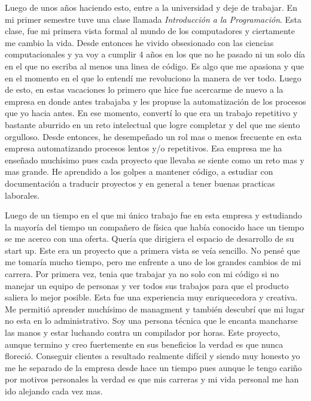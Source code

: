 \documentclass[12pt]{exam}
\begin{document}
Luego de unos años haciendo esto, entre a la universidad y deje de trabajar. En mi primer semestre tuve una clase llamada \textit{Introducción a la Programación}. Esta clase, fue mi primera vista formal al mundo de los computadores y ciertamente me cambio la vida. Desde entonces he vivido obsesionado con las ciencias computacionales y ya voy a cumplir 4 años en los que no he pasado ni un solo día en el que no escriba al menos una linea de código. Es algo que me apasiona y que en el momento en el que lo entendí me revoluciono la manera de ver todo. Luego de esto, en estas vacaciones lo primero que hice fue acercarme de nuevo a la empresa en donde antes trabajaba y les propuse la automatización de los procesos que yo hacia antes. En ese momento, convertí lo que era un trabajo repetitivo y bastante aburrido en un reto intelectual que logre completar y del que me siento orgulloso. Desde entonces, he desempeñado un rol mas o menos frecuente en esta empresa automatizando procesos lentos y/o repetitivos. Esa empresa me ha enseñado muchísimo pues cada proyecto que llevaba se siente como un reto mas y mas grande. He aprendido a los golpes a mantener código, a estudiar con documentación a traducir proyectos y en general a tener buenas practicas laborales.

Luego de un tiempo en el que mi único trabajo fue en esta empresa y estudiando la mayoría del tiempo un compañero de física que había conocido hace un tiempo se me acerco con una oferta. Quería que dirigiera el espacio de desarrollo de su start up. Este era un proyecto que a primera vista se veía sencillo. No pensé que me tomaría mucho tiempo, pero me enfrente a uno de los grandes cambios de mi carrera. Por primera vez, tenia que trabajar ya no solo con mi código si no manejar un equipo de personas y ver todos sus trabajos para que el producto saliera lo mejor posible. Esta fue una experiencia muy enriquecedora y creativa. Me permitió aprender muchísimo de managment y también descubrí que mi lugar no esta en lo administrativo. Soy una persona técnica que le encanta mancharse las manos y estar luchando contra un compilador por horas. Este proyecto, aunque termino y creo fuertemente en sus beneficios la verdad es que nunca floreció. Conseguir clientes a resultado realmente difícil y siendo muy honesto yo me he separado de la empresa desde hace un tiempo pues aunque le tengo cariño por motivos personales la verdad es que mis carreras y mi vida personal me han ido alejando cada vez mas.
\end{document}
